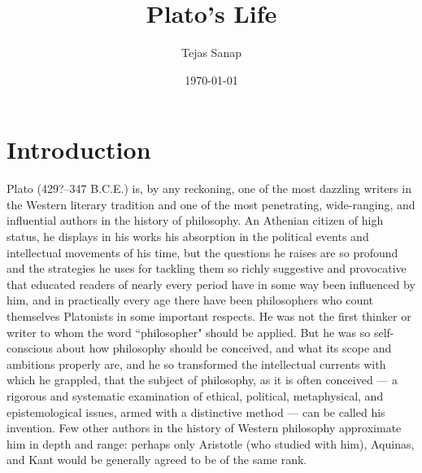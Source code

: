 \documentclass[11pt]{article}
\title{Plato's Life}
\author{Tejas Sanap}
\date{\today}
\begin{document}
	\maketitle

	\section{Introduction}

		Plato (429?–347 B.C.E.) is, by any reckoning, one of the most dazzling writers in the Western literary tradition and one of the most penetrating, wide-ranging, and influential authors in the history of philosophy. An Athenian citizen of high status, he displays in his works his absorption in the political events and intellectual movements of his time, but the questions he raises are so profound and the strategies he uses for tackling them so richly suggestive and provocative that educated readers of nearly every period have in some way been influenced by him, and in practically every age there have been philosophers who count themselves Platonists in some important respects. He was not the first thinker or writer to whom the word ``philosopher" should be applied. But he was so self-conscious about how philosophy should be conceived, and what its scope and ambitions properly are, and he so transformed the intellectual currents with which he grappled, that the subject of philosophy, as it is often conceived --- a rigorous and systematic examination of ethical, political, metaphysical, and epistemological issues, armed with a distinctive method --- can be called his invention. Few other authors in the history of Western philosophy approximate him in depth and range: perhaps only Aristotle (who studied with him), Aquinas, and Kant would be generally agreed to be of the same rank.
\end{document}
